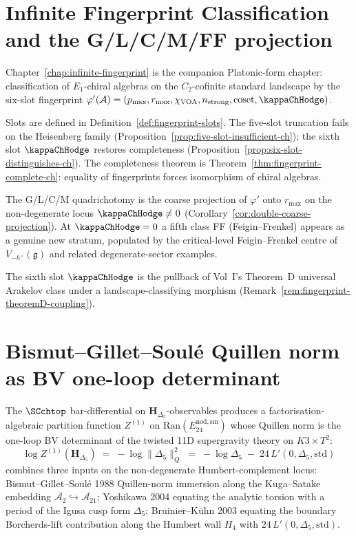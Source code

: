 \section{Infinite Fingerprint Classification and the G/L/C/M/FF projection}
\label{sec:part-viii-fingerprint}

Chapter~\ref{chap:infinite-fingerprint} is the companion Platonic-form
chapter: classification of $E_{1}$-chiral algebras on the
$C_{2}$-cofinite standard landscape by the six-slot fingerprint
$\varphi'(\mathcal{A}) = (p_{\max}, r_{\max}, \chi_{\mathrm{VOA}},
n_{\mathrm{strong}}, \mathrm{coset}, \kappaChHodge)$.

Slots are defined in Definition~\ref{def:fingerprint-slots}. The
five-slot truncation fails on the Heisenberg family
(Proposition~\ref{prop:five-slot-insufficient-ch}); the sixth slot
$\kappaChHodge$ restores completeness
(Proposition~\ref{prop:six-slot-distinguishes-ch}). The completeness
theorem is Theorem~\ref{thm:fingerprint-complete-ch}: equality of
fingerprints forces isomorphism of chiral algebras.

The G/L/C/M quadrichotomy is the coarse projection of $\varphi'$ onto
$r_{\max}$ on the non-degenerate locus $\kappaChHodge \ne 0$
(Corollary~\ref{cor:double-coarse-projection}). At $\kappaChHodge = 0$
a fifth class FF (Feigin--Frenkel) appears as a genuine new stratum,
populated by the critical-level Feigin--Frenkel centre of
$V_{-h^{\vee}}(\mathfrak{g})$ and related degenerate-sector examples.

The sixth slot $\kappaChHodge$ is the pullback of Vol~I's Theorem~D
universal Arakelov class under a landscape-classifying morphism
(Remark~\ref{rem:fingerprint-theoremD-coupling}).

\section{Bismut--Gillet--Soulé Quillen norm as BV one-loop determinant}
\label{sec:part-viii-quillen-bv}

The $\SCchtop$ bar-differential on $\mathbf{H}_{\Delta_5}$-observables
produces a factorisation-algebraic partition function $Z^{(1)}$ on
$\mathrm{Ran}(E^{\mathrm{nod,sm}}_{24})$ whose Quillen norm is the
one-loop BV determinant of the twisted 11D supergravity theory on
$K3 \times T^2$:
\[
\log Z^{(1)}(\mathbf{H}_{\Delta_5})
\;=\;
-\log\|\Delta_5\|_Q^2
\;=\;
-\log\Delta_5
\;-\;
24\,L'(0,\Delta_5,\mathrm{std})
\]
combines three inputs on the non-degenerate Humbert-complement locus:
Bismut--Gillet--Soulé 1988 Quillen-norm immersion along the Kuga--Satake
embedding
$\overline{\mathcal{A}_2}\hookrightarrow\overline{\mathcal{A}_{21}}$;
Yoshikawa 2004 equating the analytic torsion with a period of the
Igusa cusp form $\Delta_5$; Bruinier--K\"uhn 2003 equating the boundary
Borcherds-lift contribution along the Humbert wall $H_4$ with
$24\,L'(0,\Delta_5,\mathrm{std})$.


